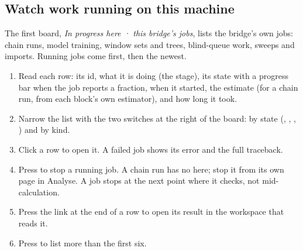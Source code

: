 
\subsection{Watch work running on this machine}\label{sec:jobs-local}
The first board, \emph{In progress here · this bridge's jobs}, lists the bridge's own jobs: chain
runs, model training, window sets and trees, blind-queue work, sweeps and imports. Running jobs come
first, then the newest.
\begin{enumerate}
\item Read each row: its id, what it is doing (the stage), its state with a progress bar when the
  job reports a fraction, when it started, the estimate (for a chain run, from each block's own
  estimator), and how long it took.
\item Narrow the list with the two switches at the right of the board: by state (,
  , , ) and by kind.
\item Click a row to open it. A failed job shows its error and the full traceback.
\item Press  to stop a running job. A chain run has no  here; stop it from its
  own page in Analyse. A job stops at the next point where it checks, not mid-calculation.
\item Press the link at the end of a row to open its result in the workspace that reads it.
\item Press  to list more than the first six.
\end{enumerate}


